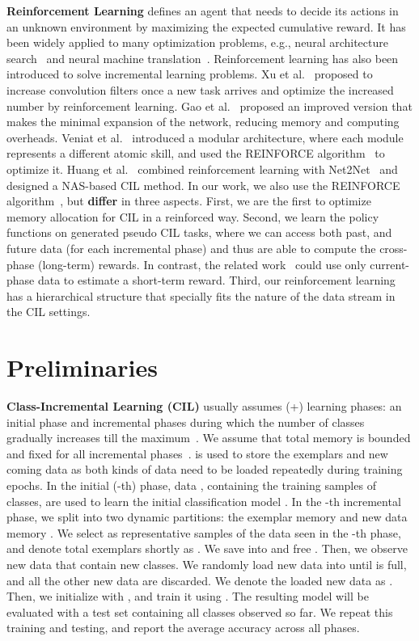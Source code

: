\documentclass{article}
\newcommand{\myparagraph}[1]{\vspace{0.1em}\noindent\textbf{#1}}
\begin{document}
\myparagraph{Reinforcement Learning} defines an agent that needs to decide its actions in an unknown environment by maximizing the expected cumulative reward. 
It has been widely applied to many optimization problems, e.g., neural architecture search~\cite{xu2018reinforced,ZophL17} and neural machine translation~\cite{RanzatoCAZ15,ShenCHHWSL16}. 
Reinforcement learning has also been introduced to solve incremental learning problems.
Xu et al.~\cite{xu2018reinforced} proposed to increase convolution filters once a new task arrives and optimize the increased number by reinforcement learning.
Gao et al.~\cite{gao2020efficient} proposed an improved version that makes the minimal expansion of the network, reducing memory and computing overheads.
Veniat et al.~\cite{abs-2012-12631} introduced a modular architecture, where each module represents a different atomic skill, and used the REINFORCE algorithm~\cite{williams1992simple} to optimize it.
Huang et al.~\cite{huang2019neural} combined reinforcement learning with Net2Net~\cite{ChenGS15ICLR} and designed a NAS-based CIL method.
In our work, we also use the REINFORCE algorithm~\cite{williams1992simple}, but \textbf{differ} 
in three aspects. 
First, we are the first to optimize memory allocation for CIL in a reinforced way.
Second, we learn the policy functions on generated pseudo CIL tasks, where we can access both past, and future data (for each incremental phase) and thus are able to compute the cross-phase (long-term) rewards.
In contrast, the related work~\cite{gao2020efficient,xu2018reinforced} could use only current-phase data to estimate a short-term reward. 
Third, our reinforcement learning has a hierarchical structure that specially fits the nature of the data stream in the CIL settings. \section{Preliminaries}
\label{sec_preliminaries}

\myparagraph{Class-Incremental Learning (CIL)} usually assumes (+) learning phases: an initial phase and  incremental phases during which the number of classes gradually increases till the maximum~\cite{douillard2020podnet,hou2019lucir,hu2021cil,liu2020mnemonics}. We assume that total memory  is bounded and fixed for all incremental phases~\cite{rebuffi2017icarl}. 
 is used to store the exemplars and new coming data as both kinds of data need to be loaded repeatedly during training epochs.
In the initial (-th) phase, data , containing the training samples of  classes, are used to learn the initial classification model . In the -th incremental phase, we split  into two dynamic partitions: 
the exemplar memory  and new data memory . We select  as representative samples of the data seen in the -th phase, and denote total exemplars  shortly as . We save  into  and free . Then, we observe new data that contain  new classes.
We randomly load new data into  until  is full, and all the other new data are discarded. We denote the loaded new data as .
Then, we initialize  with , and train it using . The resulting model  will be evaluated with a test set containing all classes observed so far. We repeat this training and testing, and report the average accuracy across all phases.
\end{document}
